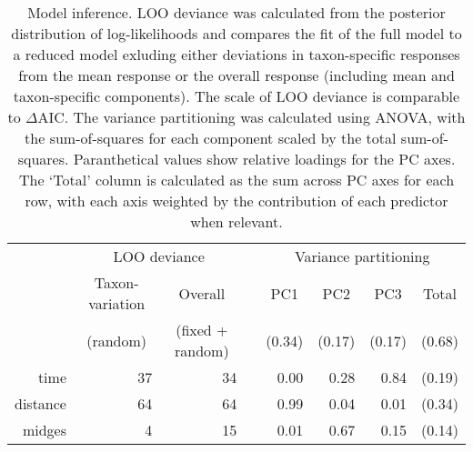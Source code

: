 \documentclass[12pt]{article}
\begin{document}

%
% 






\clearpage




\clearpage

\begin{table}
\caption{\label{tab:model-summary}
Model inference.
LOO deviance was calculated from the posterior distribution of log-likelihoods
and compares the fit of the full model to a reduced model exluding either
deviations in taxon-specific responses from the mean response or
the overall response (including mean and taxon-specific components).
The scale of LOO deviance is comparable to $\Delta$AIC.
The variance partitioning was calculated using ANOVA,
with the sum-of-squares for each component scaled by the total sum-of-squares.
Paranthetical values show relative loadings for the PC axes.
The `Total' column is calculated as the sum across PC axes for each row,
with each axis weighted by the contribution of each predictor when relevant.}
\begin{tabular}{rrrrrrrr}
\toprule
 & \multicolumn{2}{c}{LOO deviance} & & \multicolumn{4}{c}{Variance partitioning} \\
 \cmidrule{2-3} \cmidrule{5-8}
 & \multicolumn{1}{c}{Taxon-variation} & \multicolumn{1}{c}{Overall} & &
    \multicolumn{1}{c}{PC1} & \multicolumn{1}{c}{PC2} & \multicolumn{1}{c}{PC3} &
    \multicolumn{1}{c}{Total} \\
& \multicolumn{1}{c}{(random)} & \multicolumn{1}{c}{(fixed + random)} & &
    \multicolumn{1}{c}{(0.34)} & \multicolumn{1}{c}{(0.17)} &
    \multicolumn{1}{c}{(0.17)} & \multicolumn{1}{c}{(0.68)} \\
\midrule
time & 37 & 34 &  & 0.00 & 0.28 & 0.84 & (0.19)\\
distance & 64 & 64 &  & 0.99 & 0.04 & 0.01 & (0.34)\\
midges & 4 & 15 &  & 0.01 & 0.67 & 0.15 & (0.14)\\
\bottomrule
\end{tabular}
\end{table}
\end{document}
